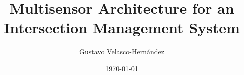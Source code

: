 \documentclass{book}
\begin{document}
\title{Multisensor Architecture for an Intersection Management System}
\author{Gustavo Velasco-Hernández}
\date{\today}
\maketitle

\tableofcontents
\setcounter{tocdepth}{3}



%



\end{document}
